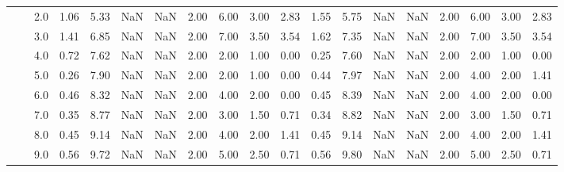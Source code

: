 \begin{tabular}{lllrrrrrrrrrrrrrrrr}
       &     & 2.0  &      1.06 &       5.33 &               NaN &                NaN & 2.00 &   6.00 &             3.00 &                         2.83 &      1.55 &       5.75 &               NaN &                NaN & 2.00 &   6.00 &             3.00 &                         2.83 \\
       &     & 3.0  &      1.41 &       6.85 &               NaN &                NaN & 2.00 &   7.00 &             3.50 &                         3.54 &      1.62 &       7.35 &               NaN &                NaN & 2.00 &   7.00 &             3.50 &                         3.54 \\
       &     & 4.0  &      0.72 &       7.62 &               NaN &                NaN & 2.00 &   2.00 &             1.00 &                         0.00 &      0.25 &       7.60 &               NaN &                NaN & 2.00 &   2.00 &             1.00 &                         0.00 \\
       &     & 5.0  &      0.26 &       7.90 &               NaN &                NaN & 2.00 &   2.00 &             1.00 &                         0.00 &      0.44 &       7.97 &               NaN &                NaN & 2.00 &   4.00 &             2.00 &                         1.41 \\
       &     & 6.0  &      0.46 &       8.32 &               NaN &                NaN & 2.00 &   4.00 &             2.00 &                         0.00 &      0.45 &       8.39 &               NaN &                NaN & 2.00 &   4.00 &             2.00 &                         0.00 \\
       &     & 7.0  &      0.35 &       8.77 &               NaN &                NaN & 2.00 &   3.00 &             1.50 &                         0.71 &      0.34 &       8.82 &               NaN &                NaN & 2.00 &   3.00 &             1.50 &                         0.71 \\
       &     & 8.0  &      0.45 &       9.14 &               NaN &                NaN & 2.00 &   4.00 &             2.00 &                         1.41 &      0.45 &       9.14 &               NaN &                NaN & 2.00 &   4.00 &             2.00 &                         1.41 \\
       &     & 9.0  &      0.56 &       9.72 &               NaN &                NaN & 2.00 &   5.00 &             2.50 &                         0.71 &      0.56 &       9.80 &               NaN &                NaN & 2.00 &   5.00 &             2.50 &                         0.71 \\

\end{tabular}
